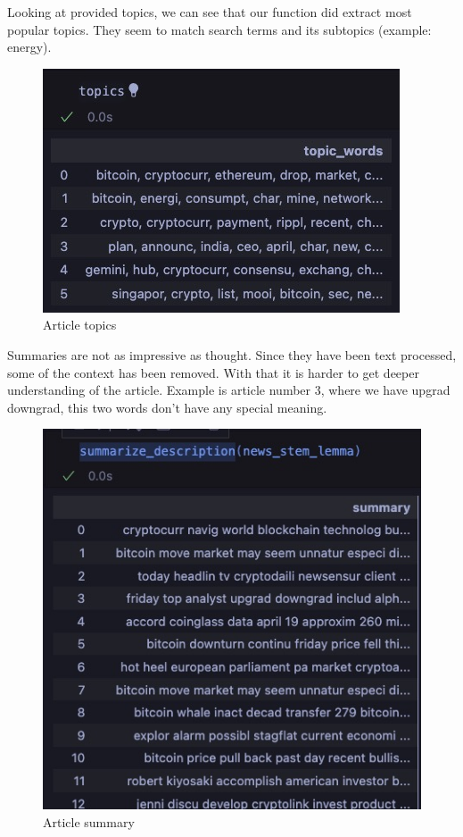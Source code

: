 Looking at provided topics, we can see that our function did extract most popular topics. They seem to match search terms and its subtopics (example: energy).
\begin{figure}[H]
\includegraphics[scale=1]{img/B2/topics.jpg}
\centering
\caption{Article topics}
\label{fig:tArticle_topics}
\end{figure}

Summaries are not as impressive as thought. Since they have been text processed, some of the context has been removed. With that it is harder to get deeper understanding of the article. Example is article number 3, where we have upgrad downgrad, this two words don't have any special meaning. 
\begin{figure}[H]
\includegraphics[scale=1]{img/B2/desc.jpg}
\centering
\caption{Article summary}
\label{fig:Article_summary}
\end{figure}